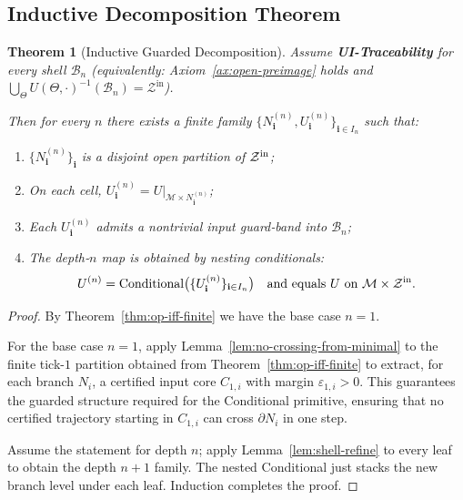\documentclass[12pt]{article}
\theoremstyle{definition}
\theoremstyle{plain}
\newtheorem{theorem}{Theorem}[section]
\begin{document}
\subsection{Inductive Decomposition Theorem}
\label{subsec:inductive-decomp-theorem}

\begin{theorem}[Inductive Guarded Decomposition]
\label{thm:inductive-decomposition}
Assume \textbf{UI-Traceability} for every shell $\mathcal B_n$ (equivalently: Axiom~\ref{ax:open-preimage} holds and $\bigcup_{\Theta}U(\Theta,\cdot)^{-1}(\mathcal B_n)=\mathcal Z^{\mathrm{in}}$). 

Then for every $n$ there exists a finite family $\{N^{(n)}_{\mathbf i}, U^{(n)}_{\mathbf i}\}_{\mathbf i\in I_n}$ such that:
\begin{enumerate}
  \item $\{N^{(n)}_{\mathbf i}\}_{\mathbf i}$ is a disjoint open partition of $\mathcal Z^{\rm in}$;
  \item On each cell, $U^{(n)}_{\mathbf i}=U|_{\mathcal M\times N^{(n)}_{\mathbf i}}$;
  \item Each $U^{(n)}_{\mathbf i}$ admits a nontrivial input guard‑band into $\mathcal B_n$;
  \item The depth‑$n$ map is obtained by nesting conditionals:
  \[
    U^{(n)}=\mathrm{Conditional}\bigl(\{U^{(n)}_{\mathbf i}\}_{\mathbf i\in I_n}\bigr)
    \quad\text{and equals }U\text{ on }\mathcal M\times\mathcal Z^{\rm in}.
  \]
\end{enumerate}
\end{theorem}

\begin{proof}
By Theorem~\ref{thm:op-iff-finite} we have the base case $n=1$.  

For the base case $n=1$, apply Lemma~\ref{lem:no-crossing-from-minimal} to the finite tick-$1$ partition obtained from Theorem~\ref{thm:op-iff-finite} to extract, for each branch $N_i$, a certified input core $C_{1,i}$ with margin $\varepsilon_{1,i}>0$. This guarantees the guarded structure required for the Conditional primitive, ensuring that no certified trajectory starting in $C_{1,i}$ can cross $\partial N_i$ in one step.


Assume the statement for depth $n$; apply Lemma~\ref{lem:shell-refine} to every leaf to obtain the depth $n+1$ family.  The nested Conditional just stacks the new branch level under each leaf.  Induction completes the proof.
\end{proof}
\end{document}
